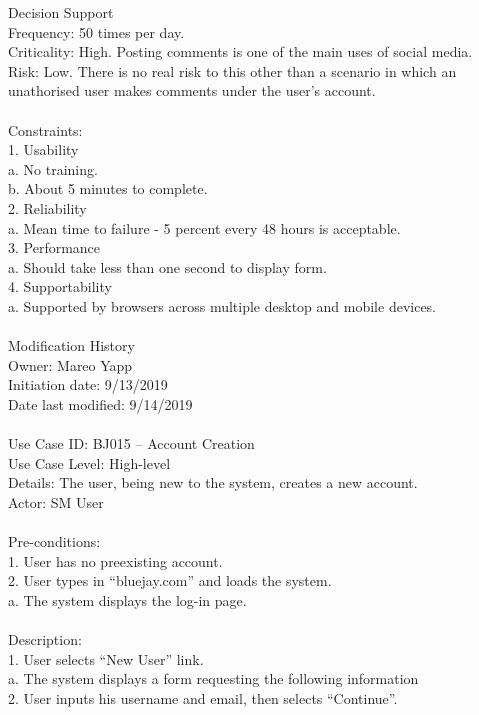 \documentclass{report}
\begin{document}
Decision Support\\
     Frequency: 50 times per day.\\
     Criticality: High. Posting comments is one of the main uses of social media. \\
     Risk: Low. There is no real risk to this other than a scenario in which an unathorised user makes comments under the user’s account.\\
\\
Constraints:\\
1.	Usability\\
	a.	No training.\\
	b.	About 5 minutes to complete.\\
2.	Reliability\\
	a.	Mean time to failure - 5 percent every 48 hours is acceptable.\\
3.	Performance\\
	a.	Should take less than one second to display form.\\
4.	Supportability\\
a.	Supported by browsers across multiple desktop and mobile devices.\\
\\
Modification History\\
     Owner: Mareo Yapp\\
     Initiation date: 9/13/2019\\
     Date last modified: 9/14/2019\\
\\
Use Case ID: BJ015 – Account Creation\\
Use Case Level: High-level\\
Details: The user, being new to the system, creates a new account.\\
Actor: SM User\\
\\
Pre-conditions: \\
1.	User has no preexisting account.\\
2.	User types in “bluejay.com” and loads the system.\\
	a.	The system displays the log-in page.\\
\\
Description: \\
1.	User selects “New User” link. \\
	a.	The system displays a form requesting the following information\\
2.	User inputs his username and email, then selects “Continue”. \\
\end{document}

